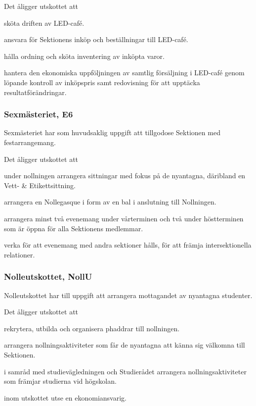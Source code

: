 \documentclass[10pt]{article}
\begin{document}
Det åligger utskottet att
\begin{tightdashlist}
\item sköta driften av LED-café.
\item ansvara för Sektionens inköp och beställningar till LED-café.
\item hålla ordning och sköta inventering av inköpta varor.
\item hantera den ekonomiska uppföljningen av samtlig försäljning i LED-café genom löpande kontroll av inköpspris samt redovisning för att upptäcka resultatförändringar.
\end{tightdashlist}

\subsubsection{Sexmästeriet, E6}
Sexmästeriet har som huvudsaklig uppgift att tillgodose Sektionen med festarrangemang.

Det åligger utskottet att
\begin{tightdashlist}
\item under nollningen arrangera sittningar med fokus på de nyantagna, däribland en Vett- \& Etikettsittning.
\item arrangera en Nollegasque i form av en bal i anslutning till Nollningen.
\item arrangera minst två evenemang under vårterminen och två under höstterminen som är öppna för alla Sektionens medlemmar.
\item verka för att evenemang med andra sektioner hålls, för att främja intersektionella relationer.
\end{tightdashlist}

\subsubsection{Nolleutskottet, NollU}
Nolleutskottet har till uppgift att arrangera mottagandet av nyantagna studenter.

Det åligger utskottet att
\begin{tightdashlist}
    \item rekrytera, utbilda och organisera phaddrar till nollningen.
    \item arrangera nollningsaktiviteter som får de nyantagna att känna sig välkomna till Sektionen.
    \item i samråd med studievägledningen och Studierådet arrangera nollningsaktiviteter som främjar studierna vid högskolan.
    \item inom utskottet utse en ekonomiansvarig.
\end{tightdashlist}
\end{document}
